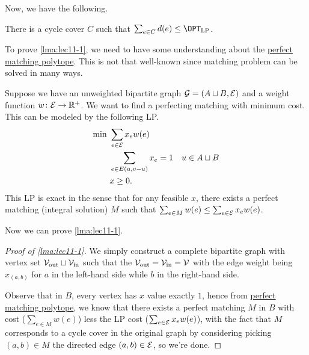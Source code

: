 Now, we have the following.

\begin{lemma}\label{lma:lec11-1}
	There is a cycle cover \(C\) such that \(\sum_{e\in C} d(e) \leq \OPT_{\mathrm{LP} }\).
\end{lemma}

To prove \autoref{lma:lec11-1}, we need to have some understanding about the \hyperref[rmk:perfect-matching-polytope]{perfect matching polytope}. This is not that well-known since matching problem can be solved in many ways.

\begin{remark}\label{rmk:perfect-matching-polytope}
	Suppose we have an unweighted bipartite graph \(\mathcal{\MakeUppercase{g}} =(A \sqcup B, \mathcal{\MakeUppercase{e}} )\) and a weight function \(w\colon \mathcal{\MakeUppercase{e}} \to \mathbb{\MakeUppercase{r}} ^+\). We want to find a perfecting matching with minimum cost. This can be modeled by the following LP.
	\[
		\begin{aligned}
			\min~ & \sum_{e\in \mathcal{\MakeUppercase{e}} } x_e w(e)                  \\
			      & \sum_{e\in E(u, v-u)} x_e = 1                     & u\in A\sqcup B \\
			      & x\geq 0.
		\end{aligned}
	\]
	This LP is exact in the sense that for any feasible \(x\), there exists a perfect matching (integral solution) \(M\) such that \(\sum_{e\in M} w(e) \leq \sum_{e\in \mathcal{\MakeUppercase{e}}} x_e w(e)\).
\end{remark}

\vspace*{1em}
Now we can prove \autoref{lma:lec11-1}.
\begin{proof}[Proof of \autoref{lma:lec11-1}]
	We simply construct a complete bipartite graph with vertex set \(\mathcal{\MakeUppercase{v}}_{\text{out}} \sqcup \mathcal{\MakeUppercase{v}}_{\text{in} }\) such that the \(\mathcal{\MakeUppercase{v}} _{\text{out} }= \mathcal{\MakeUppercase{v}} _{\text{in} }= \mathcal{\MakeUppercase{v}} \) with the edge weight being \(x_{(a, b)}\) for \(a\) in the left-hand side while \(b\) in the right-hand side.

	Observe that in \(B\), every vertex has \(x\) value exactly \(1\), hence from \hyperref[rmk:perfect-matching-polytope]{perfect matching polytope}, we know that there exists a perfect matching \(M\) in \(B\) with cost (\(\sum_{e\in M} w(e)\)) less the LP cost (\(\sum_{e\in \mathcal{\MakeUppercase{e}} } x_e w(e)\)), with the fact that \(M\) corresponds to a cycle cover in the original graph by considering picking \((a, b)\in M\) the directed edge \((a, b)\in \mathcal{\MakeUppercase{e}} \),  so we're done.
\end{proof}

